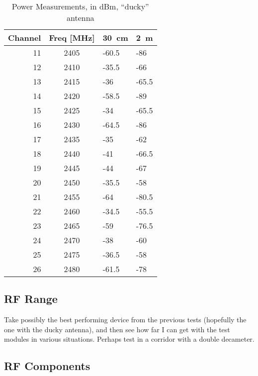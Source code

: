 \begin{table}
  \myfloatalign
  \begin{tabularx}{0.7\textwidth}{r|c|X|X}
        Channel  & Freq [MHz] &  \SI{30}{cm} & \SI{2}{m} \\ \hline
        11       & 2405       & -60.5      & -86      \\ 
        12       & 2410       & -35.5      & -66      \\ 
        13       & 2415       & -36        & -65.5    \\ 
        14       & 2420       & -58.5      & -89      \\ 
        15       & 2425       & -34        & -65.5    \\ 
        16       & 2430       & -64.5      & -86      \\ 
        17       & 2435       & -35        & -62      \\ 
        18       & 2440       & -41        & -66.5    \\ 
        19       & 2445       & -44        & -67      \\ 
        20       & 2450       & -35.5      & -58      \\ 
        21       & 2455       & -64        & -80.5    \\ 
        22       & 2460       & -34.5      & -55.5    \\ 
        23       & 2465       & -59        & -76.5    \\ 
        24       & 2470       & -38        & -60      \\ 
        25       & 2475       & -36.5      & -58      \\ 
        26       & 2480       & -61.5      & -78      \\
    \end{tabularx}
    \caption[Power Measurements of external antenna]{Power Measurements, in dBm,
    ``ducky'' antenna}
    \label{tab:power-ducky}
\end{table}
\subsection{RF Range}

Take possibly the best performing device from the previous tests (hopefully the
one with the ducky antenna), and then see how far I can get with the test
modules in various situations. Perhaps test in a corridor with a double
decameter.

\subsection{RF Components}

